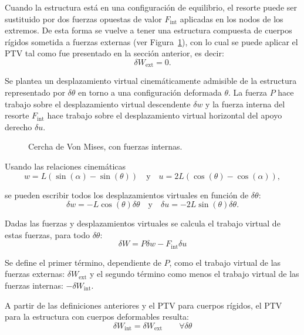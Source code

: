 Cuando la estructura está en una configuración de equilibrio, el resorte puede ser sustituido por dos fuerzas opuestas de valor $F_{\text{int}}$ aplicadas en los nodos de los extremos. %
%
De esta forma se vuelve a tener una estructura compuesta de cuerpos rígidos sometida a fuerzas externas (ver Figura~\ref{fig:CerchaMisesPTV}), con lo cual se puede aplicar el PTV tal como fue presentado en la sección anterior, es decir:
%
\begin{equation}
\delta W_{\text{ext}} = 0.
\end{equation}

Se plantea un desplazamiento virtual cinemáticamente admisible de la estructura representado por $\delta \theta$ en torno a una configuración deformada $\theta$. La fuerza $P$ hace trabajo sobre el desplazamiento virtual descendente $\delta w$ y la fuerza interna del resorte $F_{\text{int}}$ hace trabajo sobre el desplazamiento virtual horizontal del apoyo derecho $\delta u$. 

\begin{figure}[htb]
	\centering
	\def\svgwidth{0.63\textwidth}
	
	\caption{Cercha de Von Mises, con fuerzas internas.}
	\label{fig:CerchaMisesPTV}
\end{figure}

Usando las relaciones cinemáticas
$$
w=L(\sin(\alpha)-\sin(\theta))  \quad \text{y} \quad u=2L(\cos(\theta)-\cos(\alpha)),
$$

se pueden escribir todos los desplazamientos virtuales en función de $\delta \theta$:
%
\begin{equation} \label{despvirt}
\delta w = -L\cos(\theta)\delta \theta  \quad \text{y} \quad \delta u = -2L\sin(\theta)\delta \theta.
\end{equation}

Dadas las fuerzas y desplazamientos virtuales se calcula el trabajo virtual de estas fuerzas, para todo $\delta \theta$:
%
\begin{equation}\label{PTVMises}
\delta W = P \delta w - F_{\text{int}} \delta u
\end{equation}

Se define el primer término, dependiente de $P$, como el trabajo virtual de las fuerzas externas: $\delta W_{\text{ext}}$ y el segundo término como menos el trabajo virtual de las fuerzas internas: $-\delta W_{\text{int}}$.

A partir de las definiciones anteriores y el PTV para cuerpos rígidos, el PTV para la estructura con cuerpos deformables resulta:
%
\begin{equation}
\delta W_{\text{int}} = \delta W_{\text{ext}} \qquad \forall \delta \theta
\end{equation}

